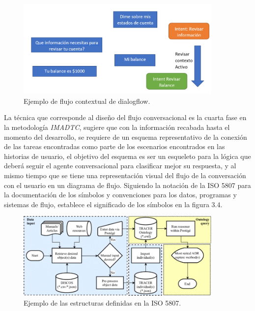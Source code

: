 \documentclass[letter, openright, 12pt]{book}
\newcommand*\setcaptioncitation[1]{\def\captioncitation{\textit{Fuente:}~#1}}
\let\captioncitation\relax
\begin{document}
\begin{figure}[htb]
\centering
\includegraphics[width=0.9\textwidth]{figura3_3}
 \setcaptioncitation{(Documentación dialogflow, 2022)}
 \caption{Ejemplo de flujo contextual de dialogflow.}
\label{fig:figura3_3}
\end{figure}

\par
La técnica que corresponde al diseño del flujo conversacional es la cuarta fase en la metodología {\it IMADTC}, sugiere que con la información recabada hasta el momento del desarrollo, se requiere de un esquema representativo de la conexión de las tareas encontradas como parte de los escenarios encontrados en las historias de usuario, el objetivo del esquema es ser un esqueleto para la lógica que deberá seguir el agente conversacional para clasificar mejor su respuesta, y al mismo tiempo que se tiene una representación visual del flujo de la conversación con el usuario en un diagrama de flujo. Siguiendo la notación de la ISO 5807 para la documentación de los símbolos y convenciones para los datos, programas y sistemas de flujo, establece el significado de los símbolos en la figura 3.4. 

\begin{figure}[!ht]
\centering
\includegraphics[width=0.9\textwidth]{figura3_4}
 \setcaptioncitation{(Yüksei, 2020)}
 \caption{Ejemplo de las estructuras definidas en la ISO 5807.}
\label{fig:figura3_4}
\end{figure}
\end{document}
